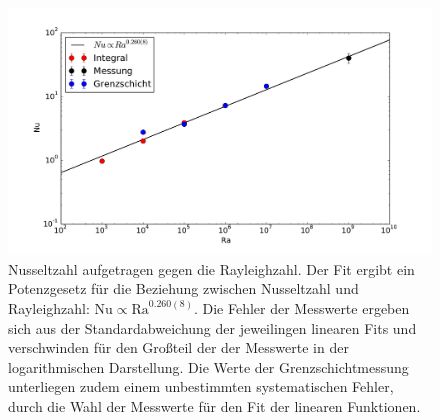 \begin{figure}
	\centering
	\includegraphics[width=\textwidth]{plots/nusselt_fit.pdf}\caption{Nusseltzahl aufgetragen gegen die Rayleighzahl.
Der Fit ergibt ein Potenzgesetz für die Beziehung zwischen Nusseltzahl und Rayleighzahl: \mbox{$\text{Nu} \propto \text{Ra}^{0.260(8)}$}. Die Fehler der Messwerte ergeben sich aus der Standardabweichung der jeweilingen linearen Fits und verschwinden für den Großteil der der Messwerte in der logarithmischen Darstellung. Die Werte der Grenzschichtmessung unterliegen zudem einem unbestimmten systematischen Fehler, durch die Wahl der Messwerte für den Fit der linearen Funktionen.}
\label{fig:nusselt}
\end{figure}










